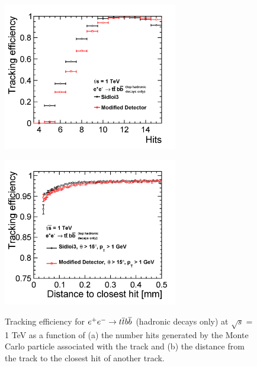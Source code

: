 \begin{figure}[h!]
\begin{minipage}{.5\textwidth}
\centering
\includegraphics[width=3.0in]{ttbb6qallEfficiencyHits_sidloi3_det_vtxbar_3doublet.png}
\label{fig:ttbbeffhit}
\end{minipage}
\begin{minipage}{.5\textwidth}
\centering
\includegraphics[width=3.0in]{ttbb6qallEfficiencyDistance_sidloi3_det_vtxbar_3doublet.png}
\label{fig:ttbbeffdistance}
\end{minipage}
\caption{Tracking efficiency for $\ee \rightarrow \ttbar \bbbar$ (hadronic decays only) at $ \sqrt{s} = $ 1 TeV as a function of (a) the number
hits generated by the Monte Carlo particle associated with the track and (b) the distance from
the track to the closest hit of another track.}
\label{fig:ttbbeffhitdist}
\end{figure}

